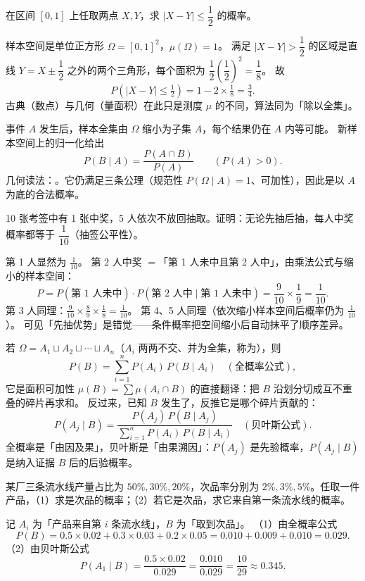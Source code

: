 \begin{explore}
\begin{example}
在区间 $[0,1]$ 上任取两点 $X,Y$，求 $|X-Y|\le\dfrac12$ 的概率。
\end{example}
\begin{solution}
样本空间是单位正方形 $\Omega=[0,1]^2$，$\mu(\Omega)=1$。
满足 $|X-Y|>\dfrac12$ 的区域是直线 $Y=X\pm\dfrac12$ 之外的两个三角形，每个面积为 $\dfrac12\left(\dfrac12\right)^2=\dfrac18$。
故
\[
  P(|X-Y|\le\tfrac12)=1-2\times\tfrac18=\tfrac34 .
\]
古典（数点）与几何（量面积）在此只是测度 $\mu$ 的不同，算法同为「除以全集」。
\end{solution}

事件 $A$ 发生后，样本全集由 $\Omega$ 缩小为子集 $A$，每个结果仍在 $A$ 内等可能。
新样本空间上的归一化给出
\[
  P(B\mid A)=\frac{P(A\cap B)}{P(A)}\qquad(P(A)>0).
\]
几何读法：。它仍满足三条公理（规范性 $P(\Omega\mid A)=1$、可加性），因此是以 $A$ 为底的合法概率。

\begin{example}
10 张考签中有 1 张中奖，5 人依次不放回抽取。证明：无论先抽后抽，每人中奖概率都等于 $\dfrac1{10}$（抽签公平性）。
\end{example}
\begin{solution}
第 1 人显然为 $\frac1{10}$。
第 2 人中奖 $=$「第 1 人未中且第 2 人中」，由乘法公式与缩小的样本空间：
\[
  P=P(\text{第 1 人未中})\cdot P(\text{第 2 人中}\mid\text{第 1 人未中})
  =\frac{9}{10}\times\frac{1}{9}=\frac{1}{10}.
\]
第 3 人同理：$\frac{9}{10}\times\frac{8}{9}\times\frac{1}{8}=\frac1{10}$。
第 4、5 人同理（依次缩小样本空间后概率仍为 $\frac1{10}$）。
可见「先抽优势」是错觉——条件概率把空间缩小后自动抹平了顺序差异。
\end{solution}

若 $\Omega=A_1\sqcup A_2\sqcup\cdots\sqcup A_n$（$A_i$ 两两不交、并为全集，称为），则
\[
  P(B)=\sum_{i=1}^{n}P(A_i)\,P(B\mid A_i)\quad(\text{全概率公式}),
\]
它是面积可加性 $\mu(B)=\sum\mu(A_i\cap B)$ 的直接翻译：把 $B$ 沿划分切成互不重叠的碎片再求和。
反过来，已知 $B$ 发生了，反推它是哪个碎片贡献的：
\[
  P(A_j\mid B)=\frac{P(A_j)\,P(B\mid A_j)}{\sum\limits_{i=1}^{n}P(A_i)\,P(B\mid A_i)}\quad(\text{贝叶斯公式}).
\]
全概率是「由因及果」，贝叶斯是「由果溯因」：$P(A_j)$ 是先验概率，$P(A_j\mid B)$ 是纳入证据 $B$ 后的后验概率。

\begin{example}
某厂三条流水线产量占比为 $50\%,30\%,20\%$，次品率分别为 $2\%,3\%,5\%$。任取一件产品，（1）求是次品的概率；（2）若它是次品，求它来自第一条流水线的概率。
\end{example}
\begin{solution}
记 $A_i$ 为「产品来自第 $i$ 条流水线」，$B$ 为「取到次品」。
（1）由全概率公式
\[
  P(B)=0.5\times0.02+0.3\times0.03+0.2\times0.05=0.010+0.009+0.010=0.029 .
\]
（2）由贝叶斯公式
\[
  P(A_1\mid B)=\frac{0.5\times0.02}{0.029}=\frac{0.010}{0.029}=\frac{10}{29}\approx0.345 .
\]
\end{solution}


\end{explore}
